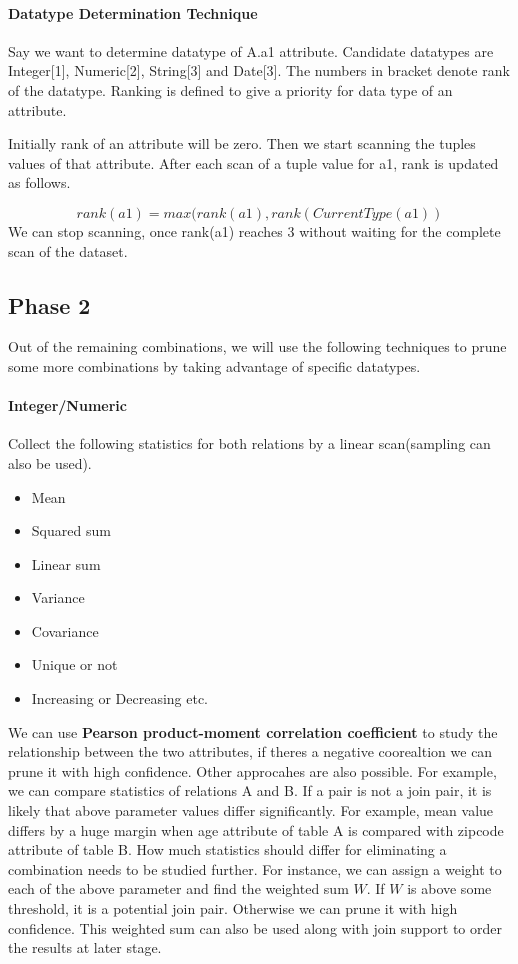 \documentclass{article}
\begin{document}
\paragraph{Datatype Determination Technique}
Say we want to determine datatype of A.a1 attribute. Candidate datatypes are Integer[1], Numeric[2], String[3] and Date[3]. The numbers in bracket denote rank of the datatype. Ranking is defined to give a priority for data type of an attribute. 

Initially rank of an attribute will be zero. Then we start scanning the tuples values of that attribute. After each scan of a tuple value for a1, rank is updated as follows.

\[rank(a1) = max(rank(a1), rank(CurrentType(a1))\]
We can stop scanning, once rank(a1) reaches 3 without waiting for the complete scan of the dataset.

\subsection{Phase 2}
Out of the remaining combinations, we will use the following techniques to prune some more combinations by taking advantage of specific datatypes.

\paragraph{Integer/Numeric}

Collect the following statistics for both relations by a linear scan(sampling can also be used). 
\begin{itemize}
\item Mean
\item Squared sum
\item Linear sum
\item Variance
\item Covariance 
\item Unique or not
\item Increasing or Decreasing etc.
\end{itemize}


    We can use \textbf{Pearson product-moment correlation coefficient} to study the relationship between the two attributes, if theres a negative coorealtion we can prune it with high confidence.
   Other approcahes are also possible. For example, we can compare statistics of relations A and B. If a pair is not a join pair, it is likely that above parameter values differ significantly. For example, mean value differs by a huge margin when age attribute of table A is compared with zipcode attribute of table B. How much statistics should differ for eliminating a combination needs to be studied further. For instance, we can assign a weight to each of the above parameter and find the weighted sum $W$. If $W$ is above some threshold, it is a potential join pair. Otherwise we can prune it with high confidence. This weighted sum can also be used along with join support to order the results at later stage.
   
\end{document}
